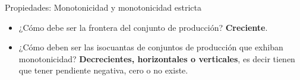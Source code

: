 \documentclass{beamer}
\theoremstyle{definition}
\begin{document}
\begin{frame}{Propiedades: Monotonicidad y monotonicidad estricta}
		\begin{itemize}
		\begin{block}{Monotonicidad}
  Una tecnología es monótona si partiendo de un plan de producción $(\textbf{x},y)$ se aumenta la cantidad de insumos a \textbf{x'} es entonces \textbf{factible} producir cualquier cantidad $[0,y]$ como mínimo.
  \end{block}
				\begin{block}{Monotonicidad estricta}
  Una tecnología es monótona estricta si partiendo de un plan de producción factible $(\textbf{x},y)$ se aumenta la cantidad de alguno de los insumos a \textbf{x'} es entonces \textbf{factible} producir cualquier cantidad $[0,f(x')]$ donde $f(x')>y$.
  \end{block}
\item ¿C\'{o}mo debe ser la frontera del conjunto de producción? \textbf{Creciente}.
\item ¿C\'{o}mo deben ser las isocuantas de conjuntos de producci\'{o}n que exhiban monotonicidad? \textbf{Decrecientes, horizontales o verticales}, es decir tienen que tener pendiente negativa, cero o no existe.
		\end{itemize}
		\end{frame}
		

\end{document}
